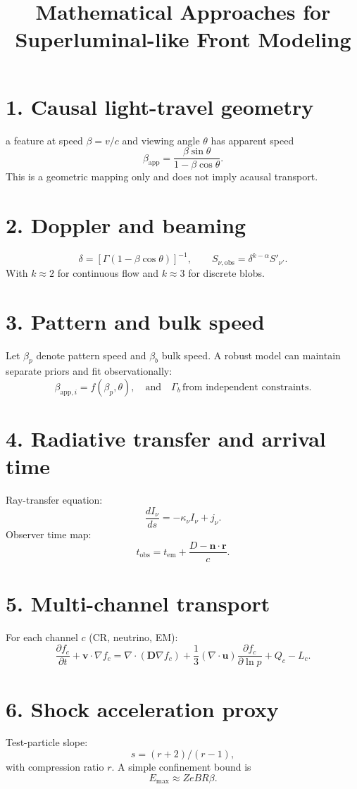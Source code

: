 \documentclass[11pt]{article}
\begin{document}
\title{Mathematical Approaches for Superluminal-like Front Modeling}
\date{}
\maketitle

\section{1. Causal light-travel geometry}

a feature at speed $\beta=v/c$ and viewing angle $\theta$ has apparent speed
\[
\beta_{\mathrm{app}} = \frac{\beta\sin\theta}{1-\beta\cos\theta}.
\]
This is a geometric mapping only and does not imply acausal transport.

\section{2. Doppler and beaming}
\[
\delta = [\Gamma(1-\beta\cos\theta)]^{-1},\qquad
S_{\nu,\mathrm{obs}} = \delta^{k-\alpha}S'_{\nu'}.
\]
With $k\approx2$ for continuous flow and $k\approx3$ for discrete blobs.

\section{3. Pattern and bulk speed}
Let $\beta_p$ denote pattern speed and $\beta_b$ bulk speed.
A robust model can maintain separate priors and fit observationally:
\[
\beta_{\mathrm{app},i}=f(\beta_p,\theta),\quad \text{and}
\quad \Gamma_b\,\text{from independent constraints}.
\]

\section{4. Radiative transfer and arrival time}
Ray-transfer equation:
\[
\frac{dI_\nu}{ds}=-\kappa_\nu I_\nu + j_\nu.
\]
Observer time map:
\[
t_\mathrm{obs}=t_\mathrm{em}+\frac{D-\mathbf n\cdot\mathbf r}{c}.
\]

\section{5. Multi-channel transport}
For each channel $c$ (CR, neutrino, EM):
\[
\frac{\partial f_c}{\partial t}+\mathbf v\cdot\nabla f_c=
\nabla\cdot(\mathbf D\nabla f_c)+\frac13(\nabla\cdot\mathbf u)
\frac{\partial f_c}{\partial\ln p}+Q_c-L_c.
\]

\section{6. Shock acceleration proxy}
Test-particle slope:
\[
s=(r+2)/(r-1),
\]
with compression ratio $r$. A simple confinement bound is
\[
E_\mathrm{max}\approx Z e B R \beta.
\]
\end{document}
